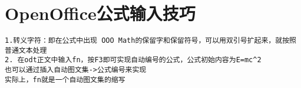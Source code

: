 \section{OpenOffice公式输入技巧}
\begin{verbatim}
1.转义字符：即在公式中出现 OOO Math的保留字和保留符号，可以用双引号扩起来，就按照普通文本处理
2. 在odt正文中输入fn，按F3即可实现自动编号的公式，公式初始内容为E=mc^2
也可以通过插入自动图文集->公式编号来实现
实际上，fn就是一个自动图文集的缩写
\end{verbatim}
